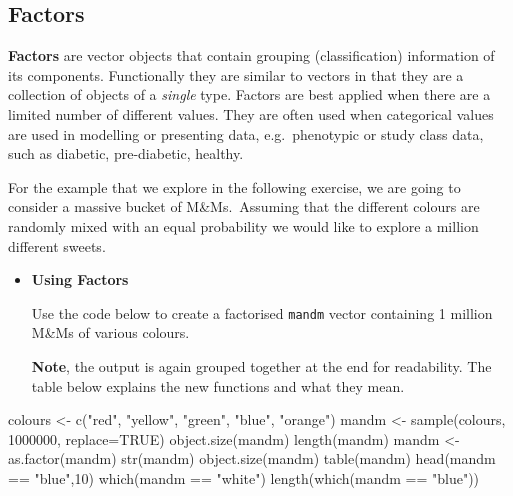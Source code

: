 \documentclass[a4paper]{book}
\newenvironment{Shaded}{}{}
\newcommand{\KeywordTok}[1]{\textcolor[rgb]{0.00,0.00,1.00}{{#1}}}
\newcommand{\DataTypeTok}[1]{{#1}}
\newcommand{\DecValTok}[1]{{#1}}
\newcommand{\StringTok}[1]{\textcolor[rgb]{0.00,0.50,0.50}{{#1}}}
\newcommand{\OtherTok}[1]{\textcolor[rgb]{1.00,0.25,0.00}{{#1}}}
\newcommand{\NormalTok}[1]{{#1}}
\newlength{\leftbarwidth}
\newlength{\leftbarsep}
\newcommand*{\leftbarcolorcmd}{\color{darkgray}}%
\renewenvironment{leftbar}{%
    \def\FrameCommand{{\leftbarcolorcmd{\vrule width \leftbarwidth\relax\hspace {\leftbarsep}}}}%
    \MakeFramed {\advance \hsize -\width \FrameRestore }%
}{%
    \endMakeFramed
}
\renewenvironment{Shaded}
{\vspace{0em}\begin{leftbar}\begin{snugshade}}
{\end{snugshade}\end{leftbar}\vspace{0pt}}
\newenvironment{rmdblock}[1]
  {\vspace{1.5em}\begin{shaded*}
  \begin{itemize}
  \renewcommand{\labelitemi}{
    \raisebox{-.7\height}[0pt][0pt]{
      {\setkeys{Gin}{width=3em,keepaspectratio}\texttt{[image: images/\#1]}}
    }
  }
  \item
  }
  {
  \end{itemize}
  \end{shaded*}
  }
\newenvironment{rmdexercise}
  {\begin{rmdblock}{exercise}}
  {\end{rmdblock}}
\begin{document}
\subsection{Factors}\label{factors}

\textbf{Factors} are vector objects that contain grouping
(classification) information of its components. Functionally they are
similar to vectors in that they are a collection of objects of a
\emph{single} type. Factors are best applied when there are a limited
number of different values. They are often used when categorical values
are used in modelling or presenting data, e.g.~phenotypic or study class
data, such as diabetic, pre-diabetic, healthy.

For the example that we explore in the following exercise, we are going
to consider a massive bucket of M\&Ms.~Assuming that the different
colours are randomly mixed with an equal probability we would like to
explore a million different sweets.

\begin{rmdexercise}
\textbf{Using Factors}

Use the code below to create a factorised \texttt{mandm} vector
containing 1 million M\&Ms of various colours.

\textbf{Note}, the output is again grouped together at the end for
readability. The table below explains the new functions and what they
mean.
\end{rmdexercise}

\begin{Shaded}
\begin{Highlighting}[]
\NormalTok{colours <-}\StringTok{ }\KeywordTok{c}\NormalTok{(}\StringTok{"red"}\NormalTok{, }\StringTok{"yellow"}\NormalTok{, }\StringTok{"green"}\NormalTok{, }\StringTok{"blue"}\NormalTok{, }\StringTok{"orange"}\NormalTok{)}
\NormalTok{mandm <-}\StringTok{ }\KeywordTok{sample}\NormalTok{(colours, }\DecValTok{1000000}\NormalTok{, }\DataTypeTok{replace=}\OtherTok{TRUE}\NormalTok{)}
\KeywordTok{object.size}\NormalTok{(mandm)}
\KeywordTok{length}\NormalTok{(mandm)}
\NormalTok{mandm <-}\StringTok{ }\KeywordTok{as.factor}\NormalTok{(mandm)}
\KeywordTok{str}\NormalTok{(mandm)}
\KeywordTok{object.size}\NormalTok{(mandm)}
\KeywordTok{table}\NormalTok{(mandm)}
\KeywordTok{head}\NormalTok{(mandm ==}\StringTok{ "blue"}\NormalTok{,}\DecValTok{10}\NormalTok{)}
\KeywordTok{which}\NormalTok{(mandm ==}\StringTok{ "white"}\NormalTok{)}
\KeywordTok{length}\NormalTok{(}\KeywordTok{which}\NormalTok{(mandm ==}\StringTok{ "blue"}\NormalTok{))}
\end{Highlighting}
\end{Shaded}
\end{document}
